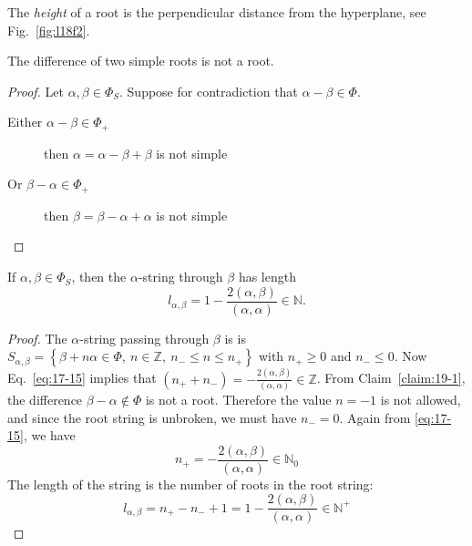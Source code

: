 
\begin{definition}[]
  The \emph{height} of a root is the perpendicular distance from the hyperplane, see Fig.~\ref{fig:l18f2}.
\end{definition}

\begin{claim}
  \label{claim:19-1}
  The difference of two simple roots is not a root.
\end{claim}
\begin{proof}
  Let $\alpha, \beta \in \Phi_S$.  Suppose for contradiction that $\alpha - \beta \in \Phi$.
  \begin{description}
    \item[Either $\alpha - \beta \in \Phi_+$] then $\alpha = \alpha - \beta + \beta$ is not simple \smashtimes
    \item[Or $\beta - \alpha \in \Phi_+$] then $\beta = \beta - \alpha + \alpha$ is not simple \smashtimes
  \end{description}
\end{proof}
\begin{claim} \label{cl:19-ii}
  If $\alpha, \beta \in \Phi_S$, then the $\alpha$-string through $\beta$ has length
  \begin{equation}
    l_{\alpha, \beta} = 1 - \frac{2(\alpha, \beta)}{(\alpha, \alpha)} \in \mathbb{N}.
  \end{equation}
\end{claim}
\begin{proof}
  The $\alpha$-string passing through $\beta$ is is $ S_{\alpha, \beta} = \left\{ \beta + n \alpha \in \Phi, \ n \in \mathbb{Z}, \ n_- \leq n \leq n_+ \right\} $ with $n_+ \geq 0$ and $n_- \leq 0$.
  Now Eq.~\eqref{eq:17-15} implies that $(n_+ + n_-) = -\frac{2 (\alpha, \beta)}{(\alpha, \alpha)} \in \mathbb{Z}$. From Claim~\ref{claim:19-1}, the difference $\beta - \alpha \not \in \Phi$ is not a root. Therefore the value $n = -1$ is not allowed, and since the root string is unbroken, we must have $n_- = 0$.
  Again from \eqref{eq:17-15}, we have
  \begin{equation}
    \label{eq:19-20}
    n_+ = -\frac{2 (\alpha, \beta)}{(\alpha, \alpha)} \in \mathbb{N}_0
  \end{equation}
  The length of the string is the number of roots in the root string:
  \begin{equation}
    l_{\alpha, \beta} = n_+ - n_- + 1 = 1 - \frac{2 (\alpha, \beta)}{(\alpha, \alpha)} \in \mathbb{N}^+
  \end{equation}
\end{proof}
